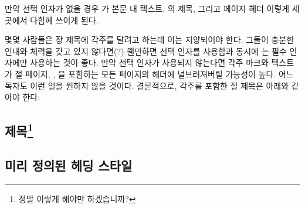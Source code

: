 만약 선택 인자가 없을 경우 가 본문 내 텍스트,
\toc{}의 제목, 그리고 페이지 헤더 이렇게
세 곳에서 다함께 쓰이게 된다.



몇몇 사람들은 장 제목에 각주를 달려고 하는데 이는 지양되어야 한다.
그들이 충분한 인내와 체력을 갖고 있지 않다면(?)
웬만하면 선택 인자를 사용함과 동시에 \cmd{\footnote}는 필수 인자에만 사용하는 것이 좋다.
만약 선택 인자가 사용되지 않는다면 각주 마크와
텍스트가 절 페이지, \toc, 을 포함하는 모든 페이지의 헤더에
널브러져버릴 가능성이 높다.
어느 독자도 이런 일을 원하지 않을 것이다.
결론적으로, 각주를 포함한 절 제목은 아래와 같아야 한다:
\begin{lcode}
	\chapter[제목]{제목\footnote{정말 이렇게 해야만 하겠습니까?}}
\end{lcode}



\section{미리 정의된 헤딩 스타일}

